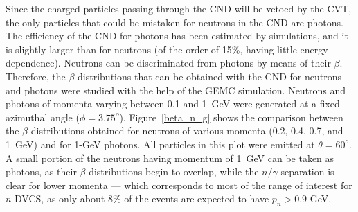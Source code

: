 Since the charged particles passing through the CND will be vetoed by the CVT, the only particles that could be mistaken for neutrons in the CND are photons. The efficiency of the CND for photons has been estimated by simulations, and it is slightly larger than for neutrons (of the order of 15\%, having little energy dependence). 
Neutrons can be discriminated from photons by means of their $\beta$.
Therefore, the $\beta$ distributions that can be obtained with the CND for neutrons and photons were studied with the help of the GEMC simulation. Neutrons and photons of momenta varying between 0.1 and 1~GeV were generated at a fixed azimuthal angle ($\phi = 3.75^o$).
%
%
%
%
Figure~\ref{beta_n_g} shows the comparison between the $\beta$ distributions obtained for neutrons of various momenta (0.2, 0.4, 0.7, and 1~GeV) and for 1-GeV photons. All particles in this plot were emitted at $\theta = 60^o$.
A small portion of the neutrons having momentum of 1~GeV can be taken as photons, as their $\beta$ distributions begin to overlap, while the $n/\gamma$ separation is clear for lower momenta --- which corresponds to most of the range of interest for $n$-DVCS, as only about 8\% of the events are expected to have $p_n>0.9$ GeV.
%
